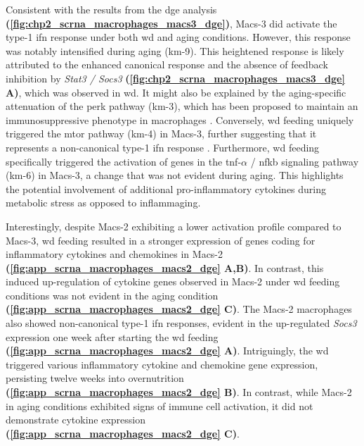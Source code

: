 \par Consistent with the results from the \gls{dge} analysis \textbf{(\autoref{fig:chp2_scrna_macrophages_macs3_dge})}, Macs-3 did activate the type-1 \gls{ifn} response under both \gls{wd} and aging conditions. However, this response was notably intensified during aging (km-9). This heightened response is likely attributed to the enhanced canonical response and the absence of feedback inhibition by \textit{Stat3 / Socs3} \textbf{(\autoref{fig:chp2_scrna_macrophages_macs3_dge} A)}, which was observed in \gls{wd}. It might also be explained by the aging-specific attenuation of the \gls{perk} pathway (km-3), which has been proposed to maintain an immunosuppressive phenotype in macrophages \textbf{\cite{raines_perk_2022}}. Conversely, \gls{wd} feeding uniquely triggered the \gls{mtor} pathway (km-4) in Macs-3, further suggesting that it represents a non-canonical type-1 \gls{ifn} response \textbf{\cite{mazewski_type_2020}}. Furthermore, \gls{wd} feeding specifically triggered the activation of genes in the \gls{tnf}-$\alpha$ / \gls{nfkb} signaling pathway (km-6) in Macs-3, a change that was not evident during aging. This highlights the potential involvement of additional pro-inflammatory cytokines during metabolic stress as opposed to inflammaging.\\

\par Interestingly, despite Macs-2 exhibiting a lower activation profile compared to Macs-3, \gls{wd} feeding resulted in a stronger expression of genes coding for inflammatory cytokines and chemokines in Macs-2 \textbf{(\autoref{fig:app_scrna_macrophages_macs2_dge} A,B)}. In contrast, this induced up-regulation of cytokine genes observed in Macs-2 under \gls{wd} feeding conditions was not evident in the aging condition \textbf{(\autoref{fig:app_scrna_macrophages_macs2_dge} C)}. The Macs-2 macrophages also showed non-canonical type-1 \gls{ifn} responses, evident in the up-regulated \textit{Socs3} expression one week after starting the \gls{wd} feeding \textbf{(\autoref{fig:app_scrna_macrophages_macs2_dge} A)}. Intriguingly, the \gls{wd} triggered various inflammatory cytokine and chemokine gene expression, persisting twelve weeks into overnutrition \textbf{(\autoref{fig:app_scrna_macrophages_macs2_dge} B)}. In contrast, while Macs-2 in aging conditions exhibited signs of immune cell activation, it did not demonstrate cytokine expression \textbf{(\autoref{fig:app_scrna_macrophages_macs2_dge} C)}.\\


